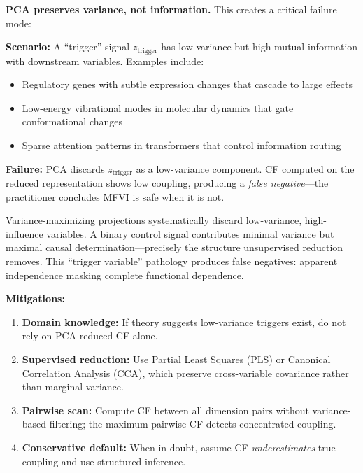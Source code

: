 \documentclass[10pt]{article} %
\theoremstyle{plain}
\theoremstyle{definition}
\begin{document}
\begin{tcolorbox}[breakable, colback=gray!5, colframe=black!75, title=\textbf{Warning: PCA Failure Mode}, fonttitle=\bfseries]
\textbf{PCA preserves variance, not information.} This creates a critical failure mode:

\textbf{Scenario:} A ``trigger'' signal $z_{\text{trigger}}$ has low variance but high mutual information with downstream variables. Examples include:
\begin{itemize}
    \item Regulatory genes with subtle expression changes that cascade to large effects
    \item Low-energy vibrational modes in molecular dynamics that gate conformational changes
    \item Sparse attention patterns in transformers that control information routing
\end{itemize}

\textbf{Failure:} PCA discards $z_{\text{trigger}}$ as a low-variance component. CF computed on the reduced representation shows low coupling, producing a \emph{false negative}---the practitioner concludes MFVI is safe when it is not.

Variance-maximizing projections systematically discard low-variance, high-influence variables. A binary control signal contributes minimal variance but maximal causal determination---precisely the structure unsupervised reduction removes. This ``trigger variable'' pathology produces false negatives: apparent independence masking complete functional dependence.

\textbf{Mitigations:}
\begin{enumerate}
    \item \textbf{Domain knowledge:} If theory suggests low-variance triggers exist, do not rely on PCA-reduced CF alone.
    \item \textbf{Supervised reduction:} Use Partial Least Squares (PLS) or Canonical Correlation Analysis (CCA), which preserve cross-variable covariance rather than marginal variance.
    \item \textbf{Pairwise scan:} Compute CF between all dimension pairs without variance-based filtering; the maximum pairwise CF detects concentrated coupling.
    \item \textbf{Conservative default:} When in doubt, assume CF \emph{underestimates} true coupling and use structured inference.
\end{enumerate}
\end{tcolorbox}
\end{document}
